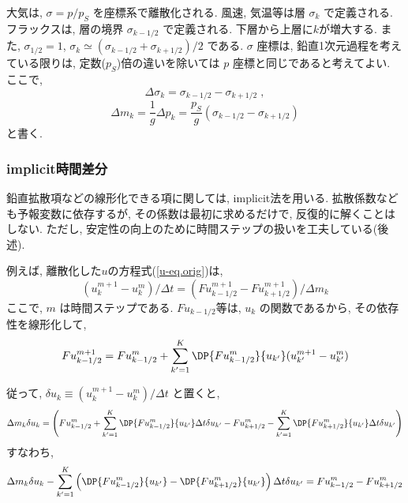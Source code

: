 大気は, $\sigma=p/p_S$ を座標系で離散化される.
風速, 気温等は層 $\sigma_k$ で定義される.
フラックスは, 層の境界 $\sigma_{k-1/2}$ で定義される.
下層から上層に$k$が増大する.
また, $\sigma_{1/2} = 1$, 
$\sigma_{k} \simeq (\sigma_{k-1/2} + \sigma_{k+1/2})/2$ である.
$\sigma$ 座標は, 鉛直1次元過程を考えている限りは, 
定数($p_S$)倍の違いを除いては $p$ 座標と同じであると考えてよい.
ここで,
\begin{equation}
  \Delta \sigma_{k} = \sigma_{k-1/2} - \sigma_{k+1/2} \; , 
\end{equation}
\begin{equation}
  \Delta m_{k} = \frac{1}{g} \Delta p_k  
   = \frac{p_S}{g} ( \sigma_{k-1/2} - \sigma_{k+1/2} )
\end{equation}
と書く.

\subsubsection{implicit時間差分}

鉛直拡散項などの線形化できる項に関しては, implicit法を用いる.
拡散係数なども予報変数に依存するが,
その係数は最初に求めるだけで, 反復的に解くことはしない.
ただし, 安定性の向上のために時間ステップの扱いを工夫している(後述). 

例えば, 離散化した$u$の方程式(\ref{u-eq.orig})は,
%
\begin{equation}
  (u_k^{m+1} - u_k^{m})/\Delta t 
    = (Fu^{m+1}_{k-1/2}-Fu^{m+1}_{k+1/2})/\Delta m_k
\end{equation}
ここで, $m$ は時間ステップである.
$Fu_{k-1/2}$等は, $u_k$ の関数であるから, その依存性を線形化して,
%
\begin{equation}
   Fu^{m+1}_{k-1/2} 
  =  Fu^{m}_{k-1/2} 
  +  \sum_{k'=1}^{K} 
     \DP{Fu^{m}_{k-1/2}}{u_{k'}} (u^{m+1}_{k'}-u^{m}_{k'})
  \label{u-flux.next}
\end{equation}

従って, $\delta u_k \equiv (u^{m+1}_{k}-u^{m}_{k})/\Delta t$ と置くと,
%
\begin{equation}
  \Delta m_k \delta u_k
  =   \left( Fu^{m}_{k-1/2}
         +  \sum_{k'=1}^{K} 
            \DP{Fu^{m}_{k-1/2}}{u_{k'}} \Delta t \delta u_{k'}
         -   Fu^{m}_{k+1/2}
         -  \sum_{k'=1}^{K}
            \DP{Fu^{m}_{k+1/2}}{u_{k'}} \Delta t \delta u_{k'}
      \right) 
\end{equation}
%
すなわち,
\begin{equation}
  \Delta m_k \delta u_k
  -  \sum_{k'=1}^{K} \left(  \DP{Fu^{m}_{k-1/2}}{u_{k'}} 
                       - \DP{Fu^{m}_{k+1/2}}{u_{k'}} \right)
                 \Delta t\delta u_{k'}
  = Fu^{m}_{k-1/2} - Fu^{m}_{k+1/2}
\end{equation}

